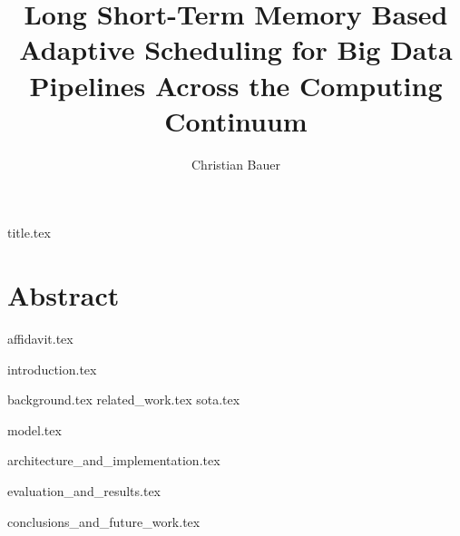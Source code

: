 \documentclass[
a4paper, %
11pt, %
onecolumn, %
openany, %
]{memoir}
\title{Long Short-Term Memory Based Adaptive Scheduling for Big Data Pipelines Across the Computing Continuum}
\author{Christian Bauer}
\begin{document}
  {title.tex}


  \tableofcontents
  \listoffigures
  \listoftables
  \lstlistoflistings

  \section*{Abstract}

  \pagebreak
  {affidavit.tex}


  {introduction.tex}

  {background.tex}
  {related_work.tex}
  {sota.tex}

  {model.tex}

  {architecture_and_implementation.tex}
  
  {evaluation_and_results.tex}

  {conclusions_and_future_work.tex}


  
  
\end{document}

